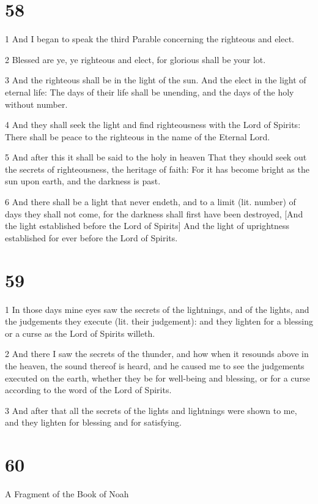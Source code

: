\chapter{58}

\par 1 And I began to speak the third Parable concerning the righteous and elect.
\par 2 Blessed are ye, ye righteous and elect, for glorious shall be your lot.
\par 3 And the righteous shall be in the light of the sun. And the elect in the light of eternal life: The days of their life shall be unending, and the days of the holy without number.
\par 4 And they shall seek the light and find righteousness with the Lord of Spirits: There shall be peace to the righteous in the name of the Eternal Lord.
\par 5 And after this it shall be said to the holy in heaven That they should seek out the secrets of righteousness, the heritage of faith: For it has become bright as the sun upon earth, and the darkness is past.
\par 6 And there shall be a light that never endeth, and to a limit (lit. number) of days they shall not come, for the darkness shall first have been destroyed, [And the light established before the Lord of Spirits] And the light of uprightness established for ever before the Lord of Spirits.

\chapter{59}

\par 1 In those days mine eyes saw the secrets of the lightnings, and of the lights, and the judgements they execute (lit. their judgement): and they lighten for a blessing or a curse as the Lord of Spirits willeth.
\par 2 And there I saw the secrets of the thunder, and how when it resounds above in the heaven, the sound thereof is heard, and he caused me to see the judgements executed on the earth, whether they be for well-being and blessing, or for a curse according to the word of the Lord of Spirits.
\par 3 And after that all the secrets of the lights and lightnings were shown to me, and they lighten for blessing and for satisfying.

\chapter{60} A Fragment of the Book of Noah


